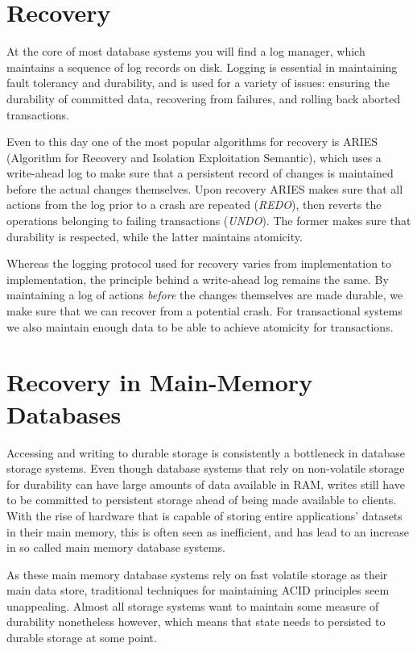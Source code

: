 \documentclass[b5paper]{report}
\begin{document}
\section{Recovery} \label{aries}
At the core of most database systems you will find a log manager, which
maintains a sequence of log records on disk. Logging is essential in maintaining
fault tolerancy and durability, and is used for a variety of issues: ensuring
the durability of committed data, recovering from failures, and rolling back
aborted transactions.

Even to this day one of the most popular algorithms for recovery is ARIES
\cite{aries} (Algorithm for Recovery and Isolation Exploitation Semantic), which
uses a write-ahead log to make sure that a persistent record of changes is
maintained before the actual changes themselves. Upon recovery ARIES makes sure
that all actions from the log prior to a crash are repeated (\textit{REDO}),
then reverts the operations belonging to failing transactions (\textit{UNDO}).
The former makes sure that durability is respected, while the latter maintains
atomicity.

Whereas the logging protocol used for recovery varies from implementation to
implementation, the principle behind a write-ahead log remains the same. By
maintaining a log of actions \textit{before} the changes themselves are made
durable, we make sure that we can recover from a potential crash. For
transactional systems we also maintain enough data to be able to achieve
atomicity for transactions.

\section{Recovery in Main-Memory Databases} \label{main-memory-recovery}
Accessing and writing to durable storage is consistently a bottleneck in
database storage systems. Even though database systems that rely on non-volatile
storage for durability can have large amounts of data available in RAM, writes
still have to be committed to persistent storage ahead of being made available
to clients. With the rise of hardware that is capable of storing entire
applications' datasets in their main memory, this is often seen as inefficient,
and has lead to an increase in so called main memory database systems.

As these main memory database systems rely on fast volatile storage as their
main data store, traditional techniques for maintaining ACID principles seem
unappealing. Almost all storage systems want to maintain some measure of
durability nonetheless however, which means that state needs to persisted to
durable storage at some point.
\end{document}
